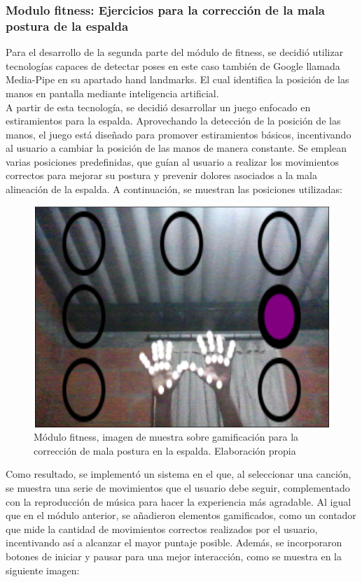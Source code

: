 \subsubsection{Modulo fitness: Ejercicios para la corrección de la mala postura de la espalda}
Para el desarrollo de la segunda parte del módulo de fitness, se decidió utilizar tecnologías capaces de detectar poses en este caso también de Google llamada Media-Pipe en su apartado hand landmarks. El cual identifica la posición de las manos en pantalla mediante inteligencia artificial.
\\
A partir de esta tecnología, se decidió desarrollar un juego enfocado en estiramientos para la espalda. Aprovechando la detección de la posición de las manos, el juego está diseñado para promover estiramientos básicos, incentivando al usuario a cambiar la posición de las manos de manera constante. Se emplean varias posiciones predefinidas, que guían al usuario a realizar los movimientos correctos para mejorar su postura y prevenir dolores asociados a la mala alineación de la espalda. A continuación, se muestran las posiciones utilizadas:
\begin{figure}[H]
  \centering
  \includegraphics[width=0.6\linewidth]{Imagenes/Fitness3.png}
  \caption{Módulo fitness, imagen de muestra sobre gamificación para la corrección de mala postura en la espalda. Elaboración propia}
  \label{fig:imagen4fitness}
\end{figure}


Como resultado, se implementó un sistema en el que, al seleccionar una canción, se muestra una serie de movimientos que el usuario debe seguir, complementado con la reproducción de música para hacer la experiencia más agradable. Al igual que en el módulo anterior, se añadieron elementos gamificados, como un contador que mide la cantidad de movimientos correctos realizados por el usuario, incentivando así a alcanzar el mayor puntaje posible. Además, se incorporaron botones de iniciar y pausar para una mejor interacción, como se muestra en la siguiente imagen:


